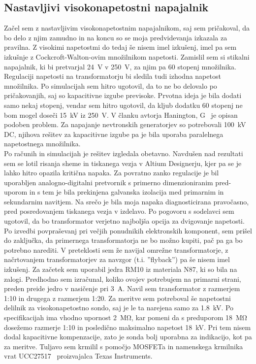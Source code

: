 \documentclass[a4paper,twoside,openright,12pt,Slovene]{book}
\begin{document}
	\subsection{Nastavljivi visokonapetostni napajalnik}
	Začel sem z nastavljivim visokonapetostnim napajalnikom, saj sem pričakoval, da bo delo z njim zamudno in na koncu so se moja predvidevanja izkazala za pravilna. Z visokimi napetostmi do tedaj še nisem imel izkušenj, imel pa sem izkušnje z Cockcroft-Walton-ovim množilnikom napetosti. Zamislil sem si stikalni napajalnik, ki bi pretvarjal \SI{24}{\volt} v \SI{250}{\volt}, za njim pa 60 stopenj množilnika. Regulaciji napetosti na transformatorju bi sledila tudi izhodna napetost množilnika. Po simulacijah sem hitro ugotovil, da to ne bo delovalo po pričakovanjih, saj so kapacitivne izgube previsoke. Prvotna ideja je bila dodati samo nekaj stopenj, vendar sem hitro ugotovil, da kljub dodatku 60 stopenj ne bom mogel doseči \SI{15}{\kilo\volt} iz \SI{250}{\volt}. V članku avtorja Hanington, G~\cite{ParallelHighVoltageMultipliers} je opisan podoben problem. Za napajanje nevtronskih generatorjev so potrebovali \SI{100}{\kilo\volt} DC, njihova rešitev za kapacitivne izgube pa je bila uporaba paralelnega napetostnega množilnika. 
~\\Po računih in simulacijah je rešitev izgledala obetavno. Navdušen nad rezultati sem se lotil risanja sheme in tiskanega vezja v Altium Designerju, kjer pa se je lahko hitro opazila kritična napaka. Za povratno zanko regulacije je bil uporabljen analogno-digitalni pretvornik s primerno dimenzioniranim pred-uporom in s tem je bila prekinjena galvanska izolacija med primarnim in sekundarnim navitjem. Na srečo je bila moja napaka diagnosticirana pravočasno, pred posredovanjem tiskanega vezja v izdelavo. Po pogovoru s sodelavci sem ugotovil, da bo transformator verjetno najboljša opcija za dvigovanje napetosti. Po izvedbi povpraševanj pri večjih ponudnikih elektronskih komponent, sem prišel do zaključka, da primernega transformatorja ne bo možno kupiti, pač pa ga bo potrebno narediti. V preteklosti sem že navijal omrežne transformatorje, z načrtovanjem transformatorjev za navzgor (t.i. ''flyback'') pa še nisem imel izkušenj. Za začetek sem uporabil jedra RM10 iz materiala N87, ki so bila na zalogi. Predhodno sem izračunal, koliko ovojev potrebujem na primarni strani, preden preide jedro v nasičenje pri \SI{3}{\ampere}. Navil sem transformator z razmerjem 1:10 in drugega z razmerjem 1:20.
Za meritve sem potreboval še napetostni delilnik za visokonapetostno sondo, saj je le ta narejena samo za \SI{1,8}{\kilo\volt}. Po specifikacijah ima vhodno upornost \SI{2}{\mega\ohm}, kar pomeni da s preduporom \SI{18}{\mega\ohm} dosežemo razmerje 1:10 in posledično maksimalno napetost \SI{18}{\kilo\volt}. Pri tem nisem dodal kapacitivne kompenzacije, zato je sonda bolj uporabna za indikacijo, kot pa za meritve. Tuljavo sem krmilil s pomočjo MOSFETa in namenskega krmilnika vrat UCC27517~\cite{TI:UCC27517} proizvajalca Texas Instruments. 
\end{document}
